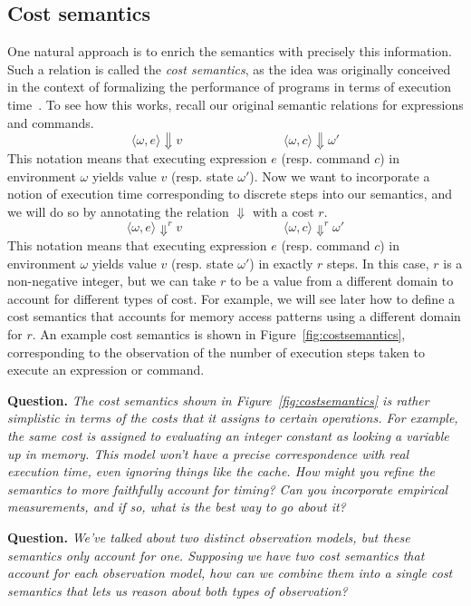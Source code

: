 \documentclass[11pt,twoside]{scrartcl}
\begin{document}
\subsection{Cost semantics}
One natural approach is to enrich the semantics with precisely this information. Such a relation is called the \emph{cost semantics}, as the idea was originally conceived in the context of formalizing the performance of programs in terms of execution time~\cite{Hoffmann11}. To see how this works, recall our original semantic relations for expressions and commands.
\[
\langle \omega, e\rangle \Downarrow v
\quad\quad\quad\quad\quad\quad\quad\quad
\langle \omega, c\rangle \Downarrow \omega'
\]
This notation means that executing expression $e$ (resp. command $c$) in environment $\omega$ yields value $v$ (resp. state $\omega'$). Now we want to incorporate a notion of execution time corresponding to discrete steps into our semantics, and we will do so by annotating the relation $\Downarrow$ with a cost $r$.
\[
\langle \omega, e\rangle \Downarrow^r v
\quad\quad\quad\quad\quad\quad\quad\quad
\langle \omega, c\rangle \Downarrow^r \omega'
\]
This notation means that executing expression $e$ (resp. command $c$) in environment $\omega$ yields value $v$ (resp. state $\omega'$) in exactly $r$ steps. In this case, $r$ is a non-negative integer, but we can take $r$ to be a value from a different domain to account for different types of cost. For example, we will see later how to define a cost semantics that accounts for memory access patterns using a different domain for $r$.
An example cost semantics is shown in Figure~\ref{fig:costsemantics}, corresponding to the observation of the number of execution steps taken to execute an expression or command. 

\textbf{Question.} \emph{The cost semantics shown in Figure~\ref{fig:costsemantics} is rather simplistic in terms of the costs that it assigns to certain operations. For example, the same cost is assigned to evaluating an integer constant as looking a variable up in memory. This model won't have a precise correspondence with real execution time, even ignoring things like the cache. How might you refine the semantics to more faithfully account for timing? Can you incorporate empirical measurements, and if so, what is the best way to go about it?}

\textbf{Question.} \emph{We've talked about two distinct observation models, but these semantics only account for one. Supposing we have two cost semantics that account for each observation model, how can we combine them into a single cost semantics that lets us reason about both types of observation?}
\end{document}

